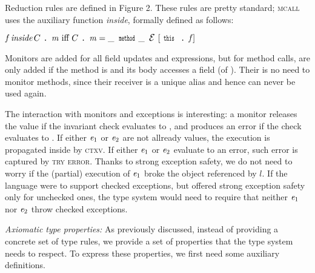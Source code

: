 \loseSpace
\noindent{}
Reduction rules are defined in Figure 2.
These rules are pretty standard;
\textsc{mcall}
uses the auxiliary function \emph{inside},
formally defined as follows:

$%
\f\, \textit{inside}\, C\singleDot\m\text{ iff }
C\singleDot\m=\_\,\Kw{method}\_\,\ctx[\Kw{this}\singleDot\f]
$


Monitors are added for all field updates and \Q@new@ expressions, but
for method calls, are only added if the method is \Q@mut@ and its body accesses a \Q@capsule@ field (of \Q@this@).
Their is no need to monitor \Q@capsule@ methods, since their receiver is a unique alias and hence can never be used again.

The interaction with monitors and exceptions is interesting:
a monitor releases the value if the invariant check evaluates to \Q@true@, and produces an error if the 
check evaluates to \Q@false@.
If either ${\mathit{e}}_1$ or ${\mathit{e}}_2$ are not allready values, the execution is propagated inside
by \textsc{ctxv}.
If either ${\mathit{e}}_1$ or ${\mathit{e}}_2$ evaluate to an error, such error is captured by 
\textsc{try error}.
Thanks to strong exception safety,
we do not need to worry
if the (partial) execution of ${\mathit{e}}_1$ broke the object referenced by $l$.
If the language were to support checked exceptions, but offered 
strong exception safety only for unchecked ones,
the type system would need to require that neither ${\mathit{e}}_1$ nor ${\mathit{e}}_2$ throw
checked exceptions.








\loseSpace
\textit{Axiomatic type properties:}
As previously discussed, instead of providing a concrete set of type rules, we provide a set of properties
that the type system needs to respect.
To express these properties, we first need some auxiliary definitions.


